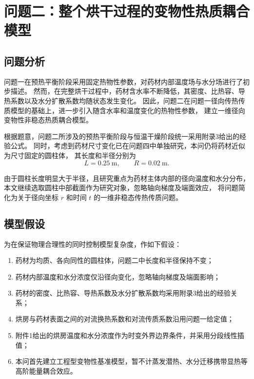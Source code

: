 \documentclass[UTF8,a4paper,12pt]{ctexart}
\begin{document}
\section{问题二：整个烘干过程的变物性热质耦合模型}

\subsection{问题分析}

问题一在预热平衡阶段采用固定热物性参数，对药材内部温度场与水分场进行了初步描述。
然而，在完整烘干过程中，药材含水率不断降低，其密度、比热容、导热系数以及水分扩散系数均随状态发生变化。
因此，问题二在问题一径向传热传质模型的基础上，进一步引入随含水率和温度变化的热物性参数，
建立一维径向变物性非稳态热质耦合模型。

根据题意，问题二所涉及的预热平衡阶段与恒温干燥阶段统一采用附录3给出的经验公式。
同时，考虑到药材尺寸变化已在问题四中单独研究，本问仍将药材近似为尺寸固定的圆柱体，
其长度和半径分别为
\begin{equation}
L=0.25~\mathrm{m}, \qquad R=0.02~\mathrm{m}.
\end{equation}

由于圆柱长度明显大于半径，且研究重点为药材主体内部的径向温度和水分分布，
本文继续选取圆柱中部截面作为研究对象，忽略轴向梯度及端面效应，
将问题简化为关于径向坐标 $r$ 和时间 $t$ 的一维非稳态传热传质问题。

\subsection{模型假设}

为在保证物理合理性的同时控制模型复杂度，作如下假设：

\begin{enumerate}
  \item 药材为均质、各向同性的圆柱体，问题二中长度和半径保持不变；
  \item 药材内部温度和水分浓度仅沿径向变化，忽略轴向梯度及端面影响；
  \item 药材的密度、比热容、导热系数及水分扩散系数均采用附录3给出的经验关系；
  \item 烘房与药材表面之间的对流换热系数和对流传质系数沿用问题一给定值；
  \item 附件1给出的烘房温度和水分浓度作为时变外界边界条件，并采用分段线性插值；
  \item 本问首先建立工程型变物性基准模型，暂不计蒸发潜热、水分迁移携带显热等高阶能量耦合效应。
\end{enumerate}
\end{document}

